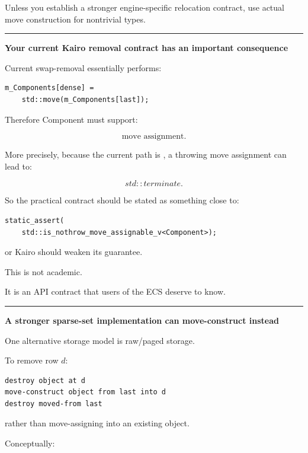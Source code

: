 Unless you establish a stronger engine-specific relocation contract, use actual move construction for nontrivial types.

\begin{center}\rule{0.5\linewidth}{0.5pt}\end{center}

\textbf{Your current Kairo removal contract has an important consequence}

Current swap-removal essentially performs:

\begin{verbatim}
m_Components[dense] =
    std::move(m_Components[last]);
\end{verbatim}

Therefore Component must support:

\[
\text{move assignment}.
\]

More precisely, because the current  path is , a throwing move assignment can lead to:

\[
std::terminate.
\]

So the practical contract should be stated as something close to:

\begin{verbatim}
static_assert(
    std::is_nothrow_move_assignable_v<Component>);
\end{verbatim}

or Kairo should weaken its  guarantee.

This is not academic.

It is an API contract that users of the ECS deserve to know.

\begin{center}\rule{0.5\linewidth}{0.5pt}\end{center}

\textbf{A stronger sparse-set implementation can move-construct instead}

One alternative storage model is raw/paged storage.

To remove row \(d\):

\begin{verbatim}
destroy object at d
move-construct object from last into d
destroy moved-from last
\end{verbatim}

rather than move-assigning into an existing object.

Conceptually:

